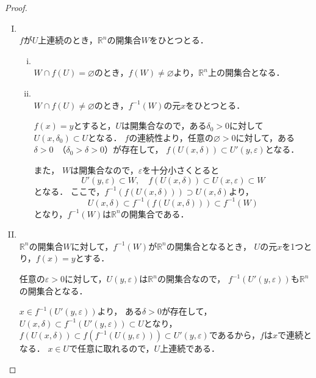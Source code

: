 \begin{leftbar}
    \begin{proof} \mbox{　}
        \begin{enumerate}[(I)]
            \item \mbox{} \\
                  $f$が$U$上連続のとき，$\mathbb{R}^n$の開集合$W$をひとつとる．
                  \begin{enumerate}[(i)]
                      \item \mbox{} \\
                            $ W \cap f(U) = \varnothing$のとき，$f(W) \ne \varnothing$より，$\mathbb{R}^n$上の開集合となる．
                      \item \mbox{} \\
                            $ W \cap f(U) \ne \varnothing$のとき，$f^{-1} (W)$の元$x$をひとつとる．

                            $ f(x)=y$とすると，$U$は開集合なので，ある$\delta_0 >0$に対して$U(x,\delta_0) \subset U$となる．
                            $f$の連続性より，任意の$\varnothing >0$に対して，ある$\delta >0$~（$\delta_0 >\delta >0$）が存在して，
                            $f(U(x,\delta)) \subset U' (y,\varepsilon)$となる．

                            また， $W$は開集合なので，$\varepsilon$を十分小さくとると
                            \[
                                U'(y,\varepsilon) \subset W,\quad f(U(x,\delta)) \subset U (x,\varepsilon) \subset W
                            \]
                            となる．
                            ここで，$f^{-1} (f(U(x,\delta))) \supset U(x,\delta)$より，
                            \[
                                U(x,\delta) \subset f^{-1} (f(U(x,\delta))) \subset f^{-1} (W)
                            \]
                            となり，$f^{-1} (W)$は$\mathbb{R}^n$の開集合である．
                  \end{enumerate}
            \item \mbox{} \\
                  $ \mathbb{R}^n$の開集合$W$に対して，$f^{-1} (W)$が$\mathbb{R}^n$の開集合となるとき，
                  $U$の元$x$を1つとり，$f(x)=y$とする．

                  任意の$\varepsilon >0$に対して，$U(y,\varepsilon)$は$\mathbb{R}^n$の開集合なので，
                  $f^{-1} (U'(y,\varepsilon))$も$\mathbb{R}^n$の開集合となる．

                  $x \in f^{-1} (U'(y,\varepsilon))$より，
                  ある$\delta >0$が存在して，$U(x,\delta) \subset  f^{-1}(U'(y,\varepsilon)) \subset U$となり，
                  $f(U(x,\delta)) \subset f(f^{-1}(U(y,\varepsilon))) \subset U'(y,\varepsilon)$であるから，$f$は$x$で連続となる．
                  $x \in U$で任意に取れるので，$U$上連続である．
        \end{enumerate}
    \end{proof}
\end{leftbar}
\newpage


